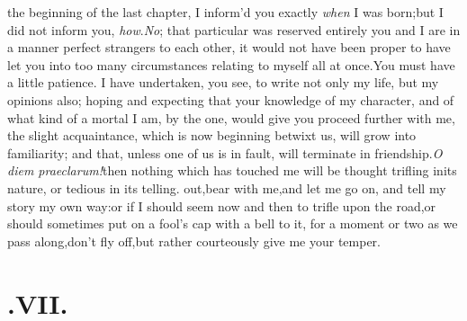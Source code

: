 \documentclass{article}
\begin{document}
 the beginning of the last chapter,
I inform’d you exactly \textit{when} I was born;\tsk but I did not inform
you, \textit{how}.\break\textit{No}; that particular was reserved entirely 
you and I are in a manner
perfect stran\-gers to each other, it would not have been proper to
have let you into too many circumstances relating to myself all at
once.\tsk You must have a little patience. I have undertaken, you see, to write not only my life,
but my opinions also; ho\-ping and expecting that your knowledge
of my character, and of what kind of a
mortal I am, by the one, would give you
proceed further with me, the slight ac\-quaintance, which is now beginning betwixt us,
will grow into familiarity; and that, unless one of us is in fault, will\break
terminate in friendship.\tsk  \textit{O diem
prae\-clarum!}\tsh  then nothing which has touched me will be
thought trifling in\break its nature, or tedious in its telling.\break
{}
out,\tsk  bear with me,\tsk  and let me go on, and tell my story my own
way:\tsh  or if I should seem now and then to trifle upon the
road,\tsk  or should sometimes put on a fool’s cap with a
bell to it, for a moment or two as we pass along,\tsk  don’t
fly off,\tsk  but rather courteously give me
your temper.

\null
\section{.\enspace VII.}
\end{document}
